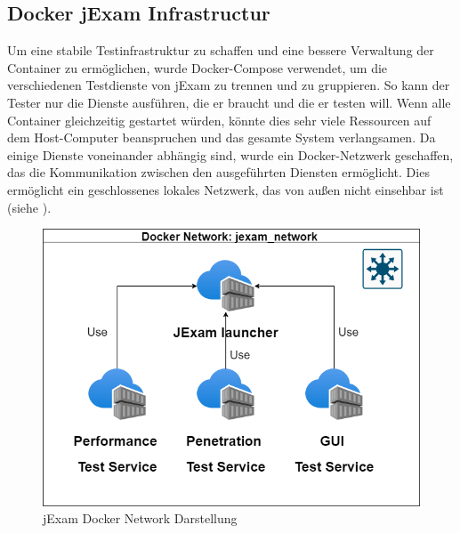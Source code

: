 \subsection{Docker jExam Infrastructur}
Um eine stabile Testinfrastruktur zu schaffen und eine bessere
Verwaltung der Container zu ermöglichen, wurde Docker-Compose
verwendet, um die verschiedenen Testdienste von jExam zu trennen
und zu gruppieren. So kann der Tester nur die Dienste ausführen,
die er braucht und die er testen will. Wenn alle Container
gleichzeitig gestartet würden, könnte dies sehr viele Ressourcen auf
dem Host-Computer beanspruchen und das gesamte System verlangsamen.
Da einige Dienste voneinander abhängig sind, wurde ein Docker-Netzwerk
geschaffen, das die Kommunikation zwischen den ausgeführten Diensten
ermöglicht. Dies ermöglicht ein geschlossenes lokales Netzwerk, das
von außen nicht einsehbar ist (siehe ).

\begin{figure}[H]
    \centering
    \includegraphics[scale=0.6]{images/all.drawio}
    \caption{jExam Docker Network Darstellung} \label{fig:dock-net}
\end{figure}





